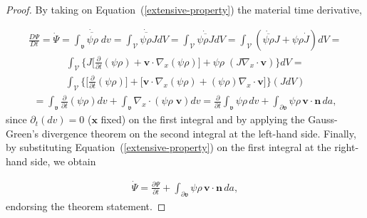 \begin{proof}
By taking on Equation~(\ref{extensive-property}) the material time
derivative, 

\begin{align*}
\frac{D\Psi}{Dt}=\dot{\Psi}=\dot{\overline{\int_{\mathfrak{v}}\psi\rho\;dv}}=
\dot{\overline{\int_{\mathscr{V}}\psi\rho{J}dV}}=
\int_{\mathscr{V}}\dot{\overline{\psi\rho{J}}}dV=
\int_{\mathscr{V}}(\dot{\overline{\psi\rho}}J+\psi\rho\dot{J})dV=
\end{align*}
\begin{align*}
\int_{\mathscr{V}}\Big\{J\Big[\frac{\partial}{\partial{t}}(\psi\rho)+
  \mathbf{v}\!\cdot\!\nabla_x(\psi\rho)\Big]+
\psi\rho\;(J\nabla_x\!\cdot\!\mathbf{v})\Big\}dV=
\end{align*}
\begin{align*}
\int_{\mathscr{V}}\Big\{\Big[\frac{\partial}{\partial{t}}(\psi\rho)\Big]
+\big[\mathbf{v}\!\cdot\!\nabla_x(\psi\rho)+
  (\psi\rho)\nabla_x\!\cdot\!\mathbf{v}\big]\Big\}(JdV)
\end{align*}
\begin{align*}
=\int_{\mathfrak{v}}\frac{\partial}{\partial{t}}(\psi\rho)dv+
\int_{\mathfrak{v}}\nabla_x\!\cdot\!(\psi\rho\;\mathbf{v})dv=
\frac{\partial}{\partial{t}}\int_{\mathfrak{v}}\psi\rho\,dv+
\int_{\partial\mathfrak{v}}\psi\rho\,\mathbf{v}\!\cdot\!\mathbf{n}\,da,
\end{align*}
since $\partial_t(dv)=0$ ($\mathbf{x}$ fixed) on the first integral
and by applying the Gauss-Green's divergence theorem on the second
integral at the left-hand side. Finally, by substituting
Equation~(\ref{extensive-property}) on the first integral at the
right-hand side, we obtain

\begin{align}
\dot{\Psi}=\frac{\partial\Psi}{\partial{t}}+
\int_{\partial\mathfrak{v}}\psi\rho\,\mathbf{v}\!\cdot\!\mathbf{n}\,da,
\end{align}
endorsing the theorem statement.
\end{proof}
